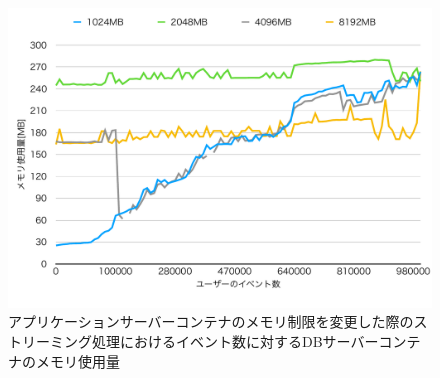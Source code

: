 \documentclass[../../../../../main]{subfiles}
\begin{document}
    \begin{figure}[H]
        \centering
        \includegraphics[width=12cm]{graph}
        \caption{アプリケーションサーバーコンテナのメモリ制限を変更した際のストリーミング処理におけるイベント数に対するDBサーバーコンテナのメモリ使用量}
        \label{fig:stream-change-app-memory-limit-db-memory-app_4_db_1_1024}
    \end{figure}
\end{document}
